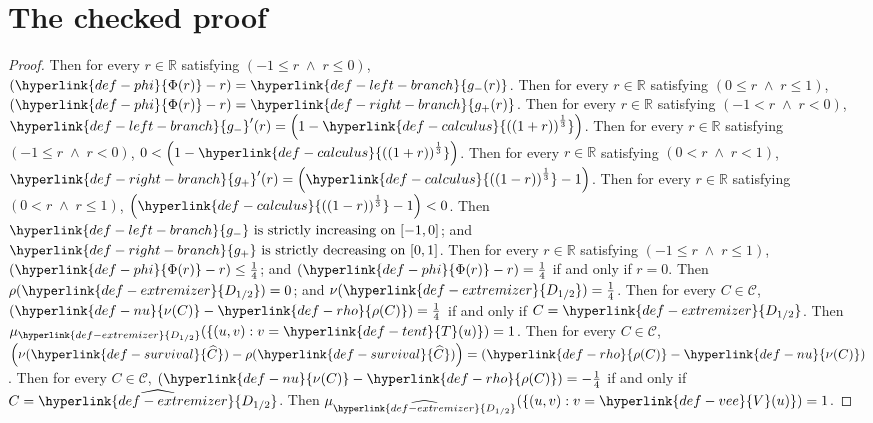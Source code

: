 \documentclass[11pt]{article}
\begin{document}
\section*{The checked proof}
\begin{proof}
Then for every $r\in \mathbb{R}$ satisfying $\left(-1 \le r \;\land\; r \le 0\right)$, $\left(\hyperlink{def-phi}{\Phi(r)} - r\right) = \hyperlink{def-left-branch}{g_-(r)}$.
Then for every $r\in \mathbb{R}$ satisfying $\left(0 \le r \;\land\; r \le 1\right)$, $\left(\hyperlink{def-phi}{\Phi(r)} - r\right) = \hyperlink{def-right-branch}{g_+(r)}$.
Then for every $r\in \mathbb{R}$ satisfying $\left(-1 < r \;\land\; r < 0\right)$, $\hyperlink{def-left-branch}{g_-}'(r)=\left(1 - \hyperlink{def-calculus}{\left(\left(1 + r\right)\right)^{\frac{1}{3}}}\right)$.
Then for every $r\in \mathbb{R}$ satisfying $\left(-1 \le r \;\land\; r < 0\right)$, $0 < \left(1 - \hyperlink{def-calculus}{\left(\left(1 + r\right)\right)^{\frac{1}{3}}}\right)$.
Then for every $r\in \mathbb{R}$ satisfying $\left(0 < r \;\land\; r < 1\right)$, $\hyperlink{def-right-branch}{g_+}'(r)=\left(\hyperlink{def-calculus}{\left(\left(1 - r\right)\right)^{\frac{1}{3}}} - 1\right)$.
Then for every $r\in \mathbb{R}$ satisfying $\left(0 < r \;\land\; r \le 1\right)$, $\left(\hyperlink{def-calculus}{\left(\left(1 - r\right)\right)^{\frac{1}{3}}} - 1\right) < 0$.
Then $\hyperlink{def-left-branch}{g_-}\text{ is strictly increasing on }[-1,0]$; and $\hyperlink{def-right-branch}{g_+}\text{ is strictly decreasing on }[0,1]$.
Then for every $r\in \mathbb{R}$ satisfying $\left(-1 \le r \;\land\; r \le 1\right)$, $\left(\hyperlink{def-phi}{\Phi(r)} - r\right) \le \frac{1}{4}$; and $\left(\hyperlink{def-phi}{\Phi(r)} - r\right) = \frac{1}{4}$ if and only if $r = 0$.
Then $\rho(\hyperlink{def-extremizer}{D_{1/2}}) = 0$; and $\nu(\hyperlink{def-extremizer}{D_{1/2}}) = \frac{1}{4}$.
Then for every $C\in \mathcal{C}$, $\left(\hyperlink{def-nu}{\nu(C)} - \hyperlink{def-rho}{\rho(C)}\right) = \frac{1}{4}$ if and only if $C = \hyperlink{def-extremizer}{D_{1/2}}$.
Then $\mu_{\hyperlink{def-extremizer}{D_{1/2}}}(\{(u,v):v=\hyperlink{def-tent}{T}(u)\})=1$.
Then for every $C\in \mathcal{C}$, $\left(\nu(\hyperlink{def-survival}{\widehat{C}}) - \rho(\hyperlink{def-survival}{\widehat{C}})\right) = \left(\hyperlink{def-rho}{\rho(C)} - \hyperlink{def-nu}{\nu(C)}\right)$.
Then for every $C\in \mathcal{C}$, $\left(\hyperlink{def-nu}{\nu(C)} - \hyperlink{def-rho}{\rho(C)}\right) = -\frac{1}{4}$ if and only if $C = \widehat{\hyperlink{def-extremizer}{D_{1/2}}}$.
Then $\mu_{\widehat{\hyperlink{def-extremizer}{D_{1/2}}}}(\{(u,v):v=\hyperlink{def-vee}{V}(u)\})=1$.

\end{proof}
\end{document}
